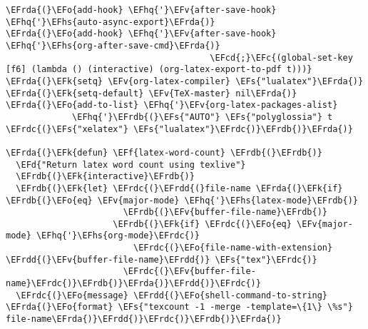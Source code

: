 \documentclass[a4wide,10pt]{article}
\newcommand{\EFc}[1]{\textcolor{EFc}{#1}} %
\newcommand{\EFcd}[1]{\textcolor{EFcd}{#1}} %
\newcommand{\EFs}[1]{\textcolor{EFs}{#1}} %
\newcommand{\EFd}[1]{\textcolor{EFd}{#1}} %
\newcommand{\EFk}[1]{\textcolor{EFk}{#1}} %
\newcommand{\EFf}[1]{\textcolor{EFf}{#1}} %
\newcommand{\EFv}[1]{\textcolor{EFv}{#1}} %
\newcommand{\EFo}[1]{\textcolor{EFo}{#1}} %
\newcommand{\EFhq}[1]{\textcolor{EFhq}{#1}} %
\newcommand{\EFhs}[1]{\textcolor{EFhs}{#1}} %
\newcommand{\EFrda}[1]{\textcolor{EFrda}{#1}} %
\newcommand{\EFrdb}[1]{\textcolor{EFrdb}{#1}} %
\newcommand{\EFrdc}[1]{\textcolor{EFrdc}{#1}} %
\newcommand{\EFrdd}[1]{\textcolor{EFrdd}{#1}} %
\begin{document}
\begin{Code}
\begin{Verbatim}
\EFrda{(}\EFo{add-hook} \EFhq{'}\EFv{after-save-hook} \EFhq{'}\EFhs{auto-async-export}\EFrda{)}
\EFrda{(}\EFo{add-hook} \EFhq{'}\EFv{after-save-hook} \EFhq{'}\EFhs{org-after-save-cmd}\EFrda{)}
                                        \EFcd{;}\EFc{(global-set-key [f6] (lambda () (interactive) (org-latex-export-to-pdf t)))}
\EFrda{(}\EFk{setq} \EFv{org-latex-compiler} \EFs{"lualatex"}\EFrda{)}
\EFrda{(}\EFk{setq-default} \EFv{TeX-master} nil\EFrda{)}
\EFrda{(}\EFo{add-to-list} \EFhq{'}\EFv{org-latex-packages-alist}
             \EFhq{'}\EFrdb{(}\EFs{"AUTO"} \EFs{"polyglossia"} t \EFrdc{(}\EFs{"xelatex"} \EFs{"lualatex"}\EFrdc{)}\EFrdb{)}\EFrda{)}

\EFrda{(}\EFk{defun} \EFf{latex-word-count} \EFrdb{(}\EFrdb{)}
  \EFd{"Return latex word count using texlive"}
  \EFrdb{(}\EFk{interactive}\EFrdb{)}
  \EFrdb{(}\EFk{let} \EFrdc{(}\EFrdd{(}file-name \EFrda{(}\EFk{if} \EFrdb{(}\EFo{eq} \EFv{major-mode} \EFhq{'}\EFhs{latex-mode}\EFrdb{)}
                       \EFrdb{(}\EFv{buffer-file-name}\EFrdb{)}
                     \EFrdb{(}\EFk{if} \EFrdc{(}\EFo{eq} \EFv{major-mode} \EFhq{'}\EFhs{org-mode}\EFrdc{)}
                         \EFrdc{(}\EFo{file-name-with-extension} \EFrdd{(}\EFv{buffer-file-name}\EFrdd{)} \EFs{"tex"}\EFrdc{)}
                       \EFrdc{(}\EFv{buffer-file-name}\EFrdc{)}\EFrdb{)}\EFrda{)}\EFrdd{)}\EFrdc{)}
  \EFrdc{(}\EFo{message} \EFrdd{(}\EFo{shell-command-to-string} \EFrda{(}\EFo{format} \EFs{"texcount -1 -merge -template=\{1\} \%s"} file-name\EFrda{)}\EFrdd{)}\EFrdc{)}\EFrdb{)}\EFrda{)}


\end{Verbatim}
\end{Code}
\end{document}
